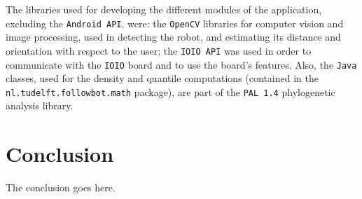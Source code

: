 \documentclass[journal]{IEEEtran}
\begin{document}
The libraries used for developing the different modules of the application, excluding the \texttt{Android API}, were: the \texttt{OpenCV} libraries for computer vision and image processing, used in detecting the robot, and estimating its distance and orientation with respect to the user; the \texttt{IOIO API} was used in order to communicate with the \texttt{IOIO} board and to use the board's features. Also, the \texttt{Java} classes, used for the density and quantile computations (contained in the \texttt{nl.tudelft.followbot.math} package), are part of the \texttt{PAL 1.4} phylogenetic analysis library. 



\section{Conclusion}
The conclusion goes here.



\end{document}

